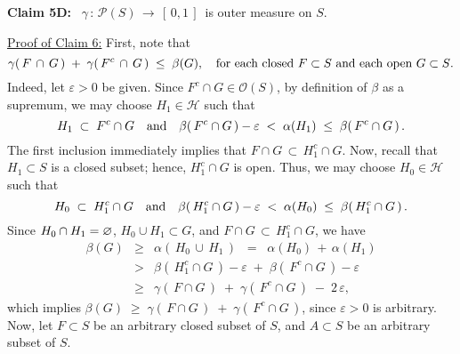 \vskip 0.2cm
\begin{center}
\begin{minipage}{6.5in}
\textbf{Claim 5D:} \,
$\gamma \,:\, \mathcal{P}(S) \,\longrightarrow\, [\,0,1\,]$\, is outer measure on $S$.
\end{minipage}
\end{center}

\vskip 0.5cm
\noindent
\underline{Proof of Claim 6:}\quad
First, note that
\begin{equation}
\label{eqnClaim6}
\gamma(\,F\,\cap\,G\,) \;+\; \gamma(\,F^{c}\,\cap\,G\,) \;\leq\; \beta(G),
\quad
\textnormal{for each closed $F \subset S$ and each open $G \subset S$}.
\end{equation}
Indeed, let $\varepsilon > 0$ be given.
Since $F^{c}\cap G \in \mathcal{O}(S)$, by definition of $\beta$ as a supremum,
we may choose $H_{1} \in \mathcal{H}$ such that
\begin{equation*}
H_{1}\;\subset\;F^{c}\cap G
\quad\textnormal{and}\quad
\beta\!\left(\,F^{c}\cap G\,\right) - \varepsilon \;<\; \alpha(H_{1}) \;\leq\; \beta\!\left(\,F^{c}\cap G\,\right).
\end{equation*}
The first inclusion immediately implies that $F\cap G \,\subset\, H_{1}^{c}\cap G$.
Now, recall that $H_{1} \subset S$ is a closed subset; hence, $H_{1}^{c}\cap G$ is open.
Thus, we may choose $H_{0} \in \mathcal{H}$ such that
\begin{equation*}
H_{0}\;\subset\;H_{1}^{c}\cap G
\quad\textnormal{and}\quad
\beta\!\left(\,H_{1}^{c}\cap G\,\right) - \varepsilon \;<\; \alpha(H_{0}) \;\leq\; \beta\!\left(\,H_{1}^{c}\cap G\,\right).
\end{equation*}
Since $H_{0}\cap H_{1} = \varnothing$, $H_{0} \cup H_{1} \subset G$, and
$F\cap G \,\subset\, H_{1}^{c}\cap G$, we have
\begin{eqnarray*}
\beta(G)
&\geq& \alpha\!\left(\,H_{0}\,\cup\,H_{1}\,\right)
\;\;=\;\; \alpha(H_{0})\,+\,\alpha(H_{1})
\\
& > & \beta\!\left(\,H_{1}^{c}\cap G\,\right) - \varepsilon \;+\; \beta\!\left(\,F^{c}\cap G\,\right) - \varepsilon
\\
&\geq& \gamma\!\left(\,F\cap G\,\right) \;+\; \gamma\!\left(\,F^{c}\cap G\,\right) \;-\; 2\,\varepsilon,
\end{eqnarray*}
which implies $\beta(G) \;\geq\; \gamma\!\left(\,F\cap G\,\right) \;+\; \gamma\!\left(\,F^{c}\cap G\,\right)$,
since $\varepsilon > 0$ is arbitrary.
\vskip 0.3cm
\noindent
Now, let $F \subset S$ be an arbitrary closed subset of $S$, and $A \subset S$ be an arbitrary subset of $S$.
